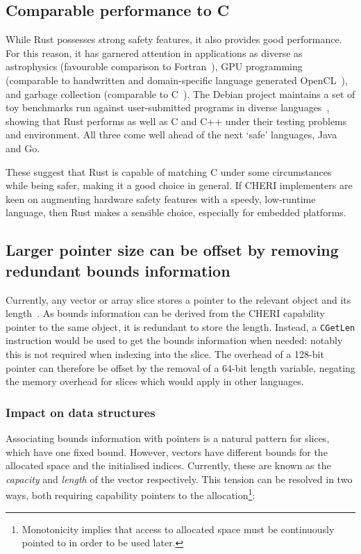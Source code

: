 \documentclass[dissertation.tex]{subfiles}
\begin{document}
\subsection{Comparable performance to C}
\label{eval:cheri-perf}

While Rust possesses strong safety features, it also provides good
performance.
For this reason, it has garnered attention in applications as diverse as
astrophysics (favourable comparison to Fortran~\cite{blanco-astro}), GPU
programming (comparable to handwritten and domain-specific language
generated OpenCL~\cite{holk-gpu}), and garbage collection (comparable to
C~\cite{lin-gc}).
The Debian project maintains a set of toy benchmarks run against
user-submitted programs in diverse
languages~\cite{debian-benchmarksgame}, showing that Rust performs as
well as C and C++ under their testing problems and environment.
All three come well ahead of the next `safe' languages, Java and Go.

These suggest that Rust is capable of matching C under some
circumstances while being safer, making it a good choice in general.
If CHERI implementers are keen on augmenting hardware safety features
with a speedy, low-runtime language, then Rust makes a sensible choice,
especially for embedded platforms.


\subsection{Larger pointer size can be offset by removing redundant bounds information}
\label{sec:eval-cheri-memfoot}

Currently, any vector or array slice stores a pointer to the relevant
object and its length~\cite{blandy-orendorff}.
As bounds information can be derived from the CHERI capability pointer
to the same object, it is redundant to store the length.
Instead, a \texttt{CGetLen} instruction would be used to get the bounds
information when needed: notably this is not required when indexing into
the slice.
The overhead of a 128-bit pointer can therefore be offset by the removal
of a 64-bit length variable, negating the memory overhead for slices
which would apply in other languages.

\subsubsection{Impact on data structures}
Associating bounds information with pointers is a natural pattern for
slices, which have one fixed bound.
However, vectors have different bounds for the allocated space and the
initialised indices.
Currently, these are known as the \emph{capacity} and \emph{length} of
the vector respectively.
This tension can be resolved in two ways, both requiring capability
pointers to the allocation\footnote{
Monotonicity implies that access to allocated space must be continuously
pointed to in order to be used later.
}:
\end{document}
